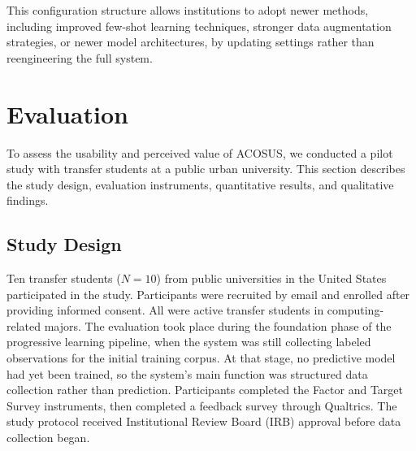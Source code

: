 \documentclass[letterpaper,11pt]{article}
\begin{document}
This configuration structure allows institutions to adopt newer methods, including improved few-shot learning techniques, stronger data augmentation strategies, or newer model architectures, by updating settings rather than reengineering the full system.

\section{Evaluation}\label{sec:evaluation}

To assess the usability and perceived value of ACOSUS, we conducted a pilot study with transfer students at a public urban university. This section describes the study design, evaluation instruments, quantitative results, and qualitative findings.

\subsection{Study Design}\label{subsec:studydesign}


%
%
Ten transfer students ($N=10$) from public universities in the United States participated in the study. Participants were recruited by email and enrolled after providing informed consent. All were active transfer students in computing-related majors. The evaluation took place during the foundation phase of the progressive learning pipeline, when the system was still collecting labeled observations for the initial training corpus. At that stage, no predictive model had yet been trained, so the system's main function was structured data collection rather than prediction. Participants completed the Factor and Target Survey instruments, then completed a feedback survey through Qualtrics. The study protocol received Institutional Review Board (IRB) approval before data collection began.
\end{document}
